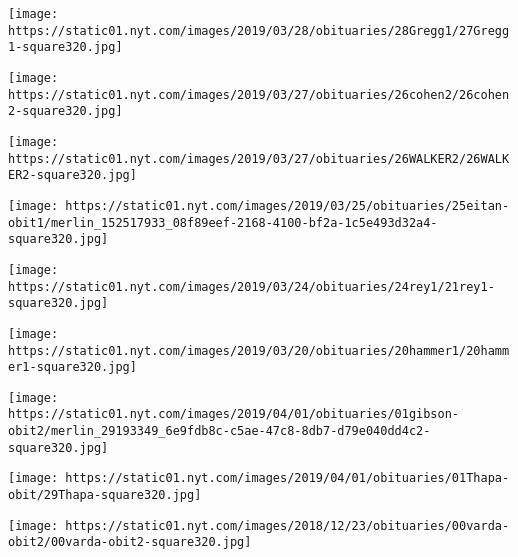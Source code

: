 \href{https://www.nytimes.com/2019/03/27/obituaries/linda-gregg-dead.html}{}

\texttt{[image: https://static01.nyt.com/images/2019/03/28/obituaries/28Gregg1/27Gregg1-square320.jpg]}

\href{https://www.nytimes.com/2019/03/26/obituaries/larry-cohen-dead.html}{}

\texttt{[image: https://static01.nyt.com/images/2019/03/27/obituaries/26cohen2/26cohen2-square320.jpg]}

\href{https://www.nytimes.com/2019/03/26/obituaries/scott-walker-dead.html}{}

\texttt{[image: https://static01.nyt.com/images/2019/03/27/obituaries/26WALKER2/26WALKER2-square320.jpg]}

\href{https://www.nytimes.com/2019/03/23/obituaries/rafi-eitan-dead.html}{}

\texttt{[image: https://static01.nyt.com/images/2019/03/25/obituaries/25eitan-obit1/merlin\_152517933\_08f89eef-2168-4100-bf2a-1c5e493d32a4-square320.jpg]}

\href{https://www.nytimes.com/2019/03/22/obituaries/antonia-rey-dead.html}{}

\texttt{[image: https://static01.nyt.com/images/2019/03/24/obituaries/24rey1/21rey1-square320.jpg]}

\href{https://www.nytimes.com/2019/03/20/obituaries/barbara-hammer-dead.html}{}

\texttt{[image: https://static01.nyt.com/images/2019/03/20/obituaries/20hammer1/20hammer1-square320.jpg]}

\href{https://www.nytimes.com/2019/03/31/obituaries/kenneth-a-gibson-dead-at-86.html}{}

\texttt{[image: https://static01.nyt.com/images/2019/04/01/obituaries/01gibson-obit2/merlin\_29193349\_6e9fdb8c-c5ae-47c8-8db7-d79e040dd4c2-square320.jpg]}

\href{https://www.nytimes.com/2019/03/29/obituaries/tejshree-thapa-dead.html}{}

\texttt{[image: https://static01.nyt.com/images/2019/04/01/obituaries/01Thapa-obit/29Thapa-square320.jpg]}

\href{https://www.nytimes.com/2019/03/29/obituaries/agnes-varda-dead.html}{}

\texttt{[image: https://static01.nyt.com/images/2018/12/23/obituaries/00varda-obit2/00varda-obit2-square320.jpg]}

\href{https://www.nytimes.com/2019/03/28/obituaries/victoria-ruvolo-dead.html}{}

